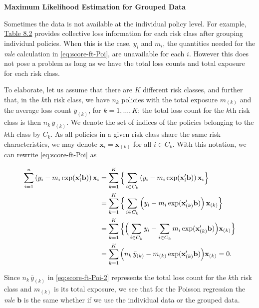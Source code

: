 \documentclass[]{book}
\theoremstyle{definition}
\theoremstyle{definition}
\theoremstyle{definition}
\theoremstyle{remark}
\begin{document}
\textbf{Maximum Likelihood Estimation for Grouped Data}

Sometimes the data is not available at the individual policy level. For
example, \protect\hyperlink{tab:8.2}{Table 8.2} provides collective loss
information for each risk class after grouping individual policies. When
this is the case, \(y_i\) and \(m_i\), the quantities needed for the
\emph{mle} calculation in \eqref{eq:score-ft-Poi}, are unavailable for
each \(i\). However this does not pose a problem as long as we have the
total loss counts and total exposure for each risk class.

To elaborate, let us assume that there are \(K\) different risk classes,
and further that, in the \(k\)th risk class, we have \(n_k\) policies
with the total exposure \(m_{(k)}\) and the average loss count
\(\bar{y}_{(k)}\), for \(k=1, \ldots, K\); the total loss count for the
\(k\)th risk class is then \(n_k\, \bar{y}_{(k)}\). We denote the set of
indices of the policies belonging to the \(k\)th class by \(C_k\). As
all policies in a given risk class share the same risk characteristics,
we may denote \(\mathbf{ x}_i=\mathbf{ x}_{(k)}\) for all \(i \in C_k\).
With this notation, we can rewrite \eqref{eq:score-ft-Poi} as

\begin{align}
\nonumber \sum^n_{i=1} \left(y_i -m_i \exp(\mathbf{ x}^{\prime}_i \mathbf{ b}) \right)\mathbf{ x}_i &= \sum^K_{k=1}\Big{\{}\sum_{i \in C_k} \left(y_i -m_i \exp(\mathbf{ x}^{\prime}_i \mathbf{ b}) \right)\mathbf{ x}_i  \Big{\}} \\
\nonumber     &  =\sum^K_{k=1}\Big{\{} \sum_{i \in C_k} \left(y_i -m_i \exp(\mathbf{ x}^{\prime}_{(k)} \mathbf{ b}) \right)\mathbf{ x}_{(k)}  \Big{\}} \\
\nonumber     &  =\sum^K_{k=1}\Big{\{}  \Big(\sum_{i \in C_k}y_i -\sum_{i \in C_k}m_i \exp(\mathbf{ x}^{\prime}_{(k)} \mathbf{ b}) \Big)\mathbf{ x}_{(k)}  \Big{\}} \\
      &  =\sum^K_{k=1} \Big(n_k\, \bar{y}_{(k)}-m_{(k)} \exp(\mathbf{ x}^{\prime}_{(k)} \mathbf{ b}) \Big)\mathbf{ x}_{(k)} =0.
\label{eq:score-ft-Poi-2}
\end{align}

Since \(n_k\, \bar{y}_{(k)}\) in \eqref{eq:score-ft-Poi-2} represents the
total loss count for the \(k\)th risk class and \(m_{(k)}\) is its total
exposure, we see that for the Poisson regression the \emph{mle}
\(\mathbf{ b}\) is the same whether if we use the individual data or the
grouped data.
\end{document}
